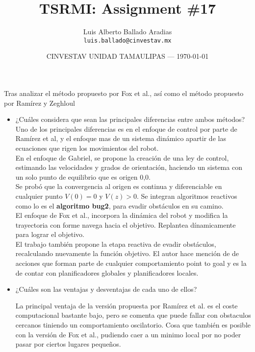 \documentclass{article}
\title{TSRMI: Assignment \#17} %
\author{Luis Alberto Ballado Aradias\\ \texttt{luis.ballado@cinvestav.mx}} %
\date{CINVESTAV UNIDAD TAMAULIPAS --- \today} %
\begin{document}
\maketitle %

Tras analizar el método propuesto por Fox et al., así como el método propuesto por Ramírez y Zeghloul\\

\begin{itemize}
\item ¿Cuáles considera que sean las principales diferencias entre ambos métodos?
  Uno de los principales diferencias es en el enfoque de control por parte de Ramírez et al, y el enfoque mas de un sistema dinámico apartir de las ecuaciones que rigen los movimientos del robot.\\

  En el enfoque de Gabriel, se propone la creación de una ley de control, estimando las velocidades y grados de orientación, haciendo un sistema con un solo punto de equilibrio que es origen 0,0.\\

  Se probó que la convergencia al origen es continua y diferenciable en cualquier punto $V(0)=0$ y $V(z) >0$. Se integran algoritmos reactivos como lo es el \textbf{algoritmo bug2}, para evadir obstáculos en su camino.\\

  El enfoque de Fox et al., incorpora la dinámica del robot y modifica la trayectoria con forme navega hacia el objetivo. Replantea dínamicamente para lograr el objetivo.\\

  El trabajo también propone la etapa reactiva de evadir obstáculos, recalculando nuevamente la función objetivo. El autor hace mención de de acciones que forman parte de cualquier comportamiento point to goal y es la de contar con planificadores globales y planificadores locales.
  
  
\item ¿Cuáles son las ventajas y desventajas de cada uno de ellos?

  La principal ventaja de la versión propuesta por Ramírez et al. es el coste computacional bastante bajo, pero se comenta que puede fallar con obstaculos cercanos tiniendo un comportamiento oscilatorio. Cosa que también es posible con la versión de Fox et al., pudiendo caer a un minimo local por no poder pasar por ciertos lugares pequeños.
  
\end{itemize}
\end{document}
